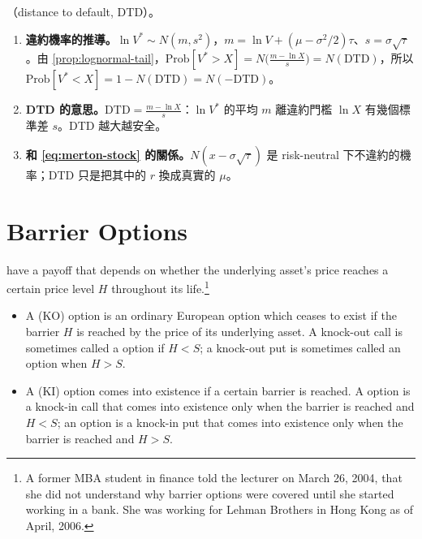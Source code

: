 \suppstart
{}

\begin{remark}
	（distance to default, DTD）。
	\begin{enumerate}[(1),nosep]
		\item \textbf{違約機率的推導。}$\ln V^{*}\sim N(m,s^{2})$，$m=\ln V+(\mu-\sigma^{2}/2)\tau$、$s=\sigma\sqrt{\tau}$。由 \autoref{prop:lognormal-tail}，$\mathrm{Prob}[V^{*}>X]=N\bigl(\frac{m-\ln X}{s}\bigr)=N(\mathrm{DTD})$，所以 $\mathrm{Prob}[V^{*}<X]=1-N(\mathrm{DTD})=N(-\mathrm{DTD})$。
		\item \textbf{DTD 的意思。}$\mathrm{DTD}=\frac{m-\ln X}{s}$：$\ln V^{*}$ 的平均 $m$ 離違約門檻 $\ln X$ 有幾個標準差 $s$。DTD 越大越安全。
		\item \textbf{和 \eqref{eq:merton-stock} 的關係。}$N(x-\sigma\sqrt{\tau})$ 是 risk-neutral 下不違約的機率；DTD 只是把其中的 $r$ 換成真實的 $\mu$。
	\end{enumerate}
\end{remark}
\suppend

\section{Barrier Options}
\label{sec:barrier}


 have a payoff that depends on whether the underlying asset's price reaches a certain price level $H$ throughout its life.\footnote{A former MBA student in finance told the lecturer on March 26, 2004, that she did not understand why barrier options were covered until she started working in a bank. She was working for Lehman Brothers in Hong Kong as of April, 2006.}

\suppstart
{}
\suppend

\begin{definition}
	\begin{itemize}[nosep]
		\item A  (KO) option is an ordinary European option which ceases to exist if the barrier $H$ is reached by the price of its underlying asset.
		      A knock-out call is sometimes called a  option if $H<S$; a knock-out put is sometimes called an  option when $H>S$.
		\item A  (KI) option comes into existence if a certain barrier is reached.
		      A  option is a knock-in call that comes into existence only when the barrier is reached and $H<S$; an  option is a knock-in put that comes into existence only when the barrier is reached and $H>S$.
	\end{itemize}
\end{definition}

